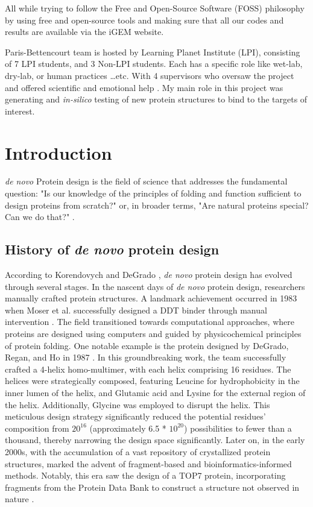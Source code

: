\documentclass[11pt,a4paper]{article}
\begin{document}
All while trying to follow the Free and Open-Source Software (FOSS) philosophy \cite{gun_foss} by using free and open-source tools and making sure that all our codes and results are available via the iGEM website.

Paris-Bettencourt team is hosted by Learning Planet Institute (LPI),
consisting of 7 LPI students, and 3 Non-LPI students.
Each has a specific role like wet-lab, dry-lab, or human practices \ldots etc. With 4 supervisors who oversaw the project and offered scientific and emotional help \cite{paris_bettencourt_team}.
My main role in this project was generating and \emph{in-silico} testing of new protein structures to bind to the targets of interest.


\section{Introduction}

\emph{de novo} Protein design is the field of science that addresses the 
fundamental question: "Is our knowledge of the principles of folding 
and function sufficient to design proteins from scratch?" 
\cite{korendovych2020novo} or, in broader terms, "Are natural proteins 
special? Can we do that?" \cite{hecht2018natural}.

\subsection{History of \emph{de novo} protein design}

According to Korendovych and DeGrado \cite{korendovych2020novo}, \emph{de novo} 
protein design has evolved through several stages.
In the nascent days of \emph{de novo} protein design, researchers manually 
crafted protein structures. A landmark achievement occurred in 1983 
when Moser et al. successfully designed a DDT binder through manual 
intervention \cite{moser1983artificial}.
The field transitioned towards computational approaches, where proteins 
are designed using computers and guided by physicochemical principles 
of protein folding. One notable example is the protein designed by 
DeGrado, Regan, and Ho in 1987 \cite{degrado1987design}. In this 
groundbreaking work, the team successfully crafted a 4-helix 
homo-multimer, with each helix comprising 16 residues. The helices were 
strategically composed, featuring Leucine for hydrophobicity in the 
inner lumen of the helix, and Glutamic acid and Lysine for the external 
region of the helix. Additionally, Glycine was employed to disrupt the 
helix. This meticulous design strategy significantly reduced the 
potential residues' composition from $20^{16}$ (approximately 6.5 * $10^
{20}$) possibilities to fewer than a thousand, thereby narrowing the 
design space significantly. 
Later on, in the early 2000s, with the accumulation of a vast repository 
of crystallized protein structures,  marked the advent of 
fragment-based and bioinformatics-informed methods. Notably, this era 
saw the design of a  TOP7 protein, incorporating fragments from the 
Protein Data Bank to construct a structure not observed in nature \cite
{kuhlman2003design}.
\end{document}
